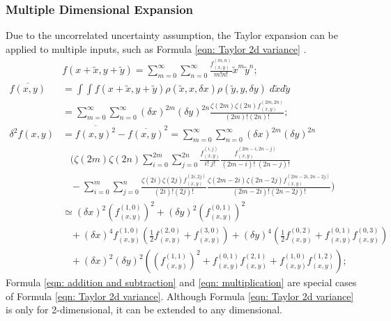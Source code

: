 \documentclass[twoside]{article}
\numberwithin{equation}{section}
\newcommand{\eqspace}{\;\;\;}
\begin{document}
\subsubsection{Multiple Dimensional Expansion}

Due to the uncorrelated uncertainty assumption, the Taylor expansion can be applied to multiple inputs, such as Formula \eqref{eqn: Taylor 2d variance} \cite{Prev_Precision_Arithmetic} .
\begin{align}
\label{eqn: Taylor 2d}
&f(x + \tilde{x}, y + \tilde{y}) = \sum_{m=0}^{\infty} \sum_{n=0}^{\infty} \frac{f^{(m,n)}_{(x,y)}}{m! n!} \tilde{x}^m \tilde{y}^n; \\
\label{eqn: Taylor 2d mean}
\overline{f(x,y)} &= \int \int f(x + \tilde{x}, y + \tilde{y}) \rho(\tilde{x}, x, \delta x) \rho(\tilde{y}, y, \delta y)\; d \tilde{x} d \tilde{y} \nonumber \\
&= \sum_{m=0}^{\infty} \sum_{n=0}^{\infty} (\delta x)^{2m} (\delta y)^{2n}  \frac{\zeta(2m) \zeta(2n) f^{(2m,2n)}_{(x,y)}}{(2m)! (2n)!}; \\ 
\label{eqn: Taylor 2d variance}
\delta^2 f(x, y) &= \overline{f(x, y)^2} - \overline{f(x, y)}^2 = \sum_{m=0}^{\infty} \sum_{n=0}^{\infty} (\delta x)^{2m} (\delta y)^{2n} \nonumber \\
&\eqspace (\zeta(2m) \zeta(2n) \sum_{i=0}^{2m} \sum_{j=0}^{2n} \frac{f^{(i,j)}_{(x,y)}}{i!\;j!}\frac{f^{(2m-i,2n-j)}_{(x,y)}}{(2m-i)!\;(2n-j)!} \nonumber \\
&\eqspace - \sum_{i=0}^{m} \sum_{j=0}^{n} \frac{\zeta(2i) \zeta(2j) f^{(2i,2j)}_{(x,y)}}{(2i)!(2j)!}\frac{\zeta(2m-2i) \zeta(2n-2j) f^{(2m-2i,2n-2j)}_{(x,y)}}{(2m-2i)!(2n-2j)!}) \\
&\simeq (\delta x)^2 (f^{(1,0)}_{(x,y)})^2 + (\delta y)^2 (f^{(0,1)}_{(x,y)})^2  \nonumber \\
&\eqspace + (\delta x)^4 f^{(1,0)}_{(x,y)} (\frac{1}{2} f^{(2,0)}_{(x,y)} + f^{(3,0)}_{(x,y)})
      + (\delta y)^4 (\frac{1}{2} f^{(0,2)}_{(x,y)} + f^{(0,1)}_{(x,y)} f^{(0,3)}_{(x,y)}) \nonumber \\
&\eqspace + (\delta x)^2 (\delta y)^2 ((f^{(1,1)}_{(x,y)})^2 + f^{(0,1)}_{(x,y)} f^{(2,1)}_{(x,y)} + f^{(1,0)}_{(x,y)} f^{(1,2)}_{(x,y)});
\end{align}
Formula \eqref{eqn: addition and subtraction} and \eqref{eqn: multiplication} are special cases of Formula \eqref{eqn: Taylor 2d variance}.
Although Formula \eqref{eqn: Taylor 2d variance} is only for 2-dimensional, it can be extended to any dimensional.
\end{document}
